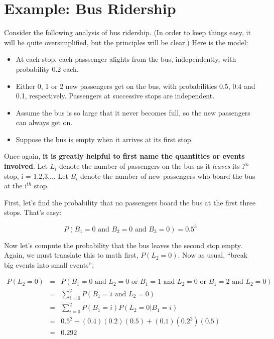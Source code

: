 \section{Example:  Bus Ridership}
\label{busridership}

Consider the following analysis of bus ridership.  (In order to keep
things easy, it will be quite oversimplified, but the principles will be
clear.)  Here is the model:

\begin{itemize}

\item At each stop, each passsenger alights from the bus, independently,
with probability 0.2 each.  

\item Either 0, 1 or 2 new passengers get on the bus, with probabilities
0.5, 0.4 and 0.1, respectively.  Passengers at successive stops are
independent.

\item Assume the bus is so large that it never becomes full, so the new
passengers can always get on. 

\item Suppose the bus is empty when it arrives at its first stop.

\end{itemize}

Once again, {\bf it is greatly helpful to first name the quantities or
events involved}.  Let $L_i$ denote the number of passengers on the bus
as it {\it leaves} its i$^{th}$ stop, i = 1,2,3,...  Let $B_i$ denote
the number of new passengers who board the bus at the i$^{th}$ stop.  

First, let's find the probability that no passengers board the bus at
the first three stops.  That's easy:

\begin{equation}
P(B_1 = 0 \textrm{ and } B_2 = 0 \textrm{ and } B_3 = 0) = 0.5^3
\end{equation}

Now let's compute the probability that the bus leaves the second stop
empty.  Again, we must translate this to math first, $P(L_2 = 0)$.  Now
as usual, ``break big events into small events'':

\begin{eqnarray}
P(L_2 = 0) &=& 
P(B_1 = 0 \textrm{ and } L_2 = 0 \textrm{ or }
B_1 = 1 \textrm{ and } L_2 = 0 \textrm{ or }
B_1 = 2 \textrm{ and } L_2 = 0) \\
&=& \sum_{i=0}^2 P(B_1 = i \textrm{ and } L_2 = 0) \\
&=& \sum_{i=0}^2 P(B_1 = i) P(L_2 = 0 | B_1 = i) \\
&=& 0.5^2 + (0.4) (0.2) (0.5) + (0.1) (0.2^2) (0.5) \\
&=& 0.292 \label{eq292}
\end{eqnarray}

